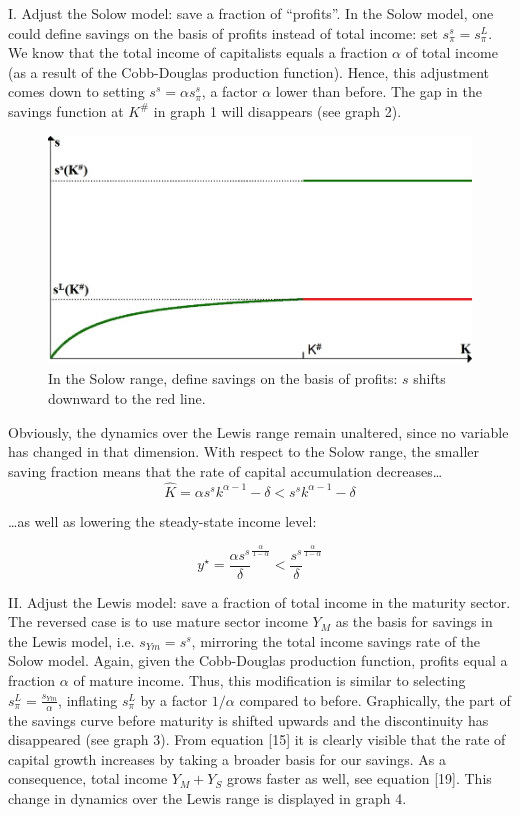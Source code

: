 \documentclass[a4paper]{article}
\begin{document}
I. Adjust the Solow model: save a fraction of “profits”.
In the Solow model, one could define savings on the basis of profits instead of total income: set $s_\pi^s=s_\pi^L$. We know that the total income of capitalists equals a fraction $\alpha$ of total income (as a result of the Cobb-Douglas production function). Hence, this adjustment comes down to setting $s^s= \alpha s_\pi^s$, a factor $\alpha$ lower than before. The gap in the savings function at $K^{\#}$ in graph 1 will disappears (see graph 2).

\begin{figure}
\includegraphics[width=\linewidth]{graph2.png}
\caption{\label{fig:Graph 2}In the Solow range, define savings on the basis of profits: $s$ shifts downward to the red line.}
\end{figure}

Obviously, the dynamics over the Lewis range remain unaltered, since no variable has changed in that dimension. With respect to the Solow range, the smaller saving fraction means that the rate of capital accumulation decreases…
\begin{equation}
\hat{K}= \alpha s^s k^{\alpha-1}-\delta<s^s k^{\alpha-1}-\delta
\end{equation}

\ldots as well as lowering the steady-state income level:

\begin{equation}
y^{\star} = \frac{\alpha s^s}{\delta}^{\frac{\alpha}{1-\alpha}}<\frac{s^s}{\delta}^{\frac{\alpha}{1-\alpha}}
\end{equation}

II. Adjust the Lewis model: save a fraction of total income in the maturity sector.
The reversed case is to use mature sector income $Y_M$ as the basis for savings in the Lewis model, i.e. $s_{Ym}= s^s$, mirroring the total income savings rate of the Solow model. Again, given the Cobb-Douglas production function, profits equal a fraction $\alpha$ of mature income. Thus, this modification is similar to selecting $s_\pi^L=\frac{s_{Ym}}{\alpha}$, inflating $s_\pi^L$ by a factor $1/\alpha$ compared to before. Graphically, the part of the savings curve before maturity is shifted upwards and the discontinuity has disappeared (see graph 3). 
From equation [15] it is clearly visible that the rate of capital growth increases by taking a broader basis for our savings. As a consequence, total income $Y_M+Y_S$ grows faster as well, see equation [19]. This change in dynamics over the Lewis range is displayed in graph 4. 
\end{document}
